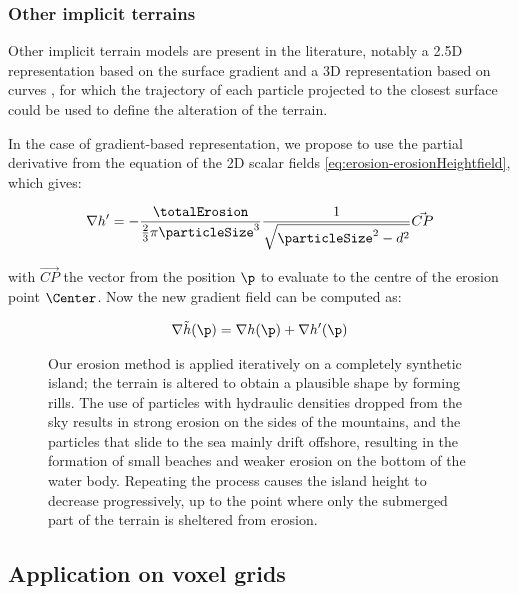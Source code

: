 \subsubsection{Other implicit terrains}
\label{sec:erosion-application_on_other_implicit}
Other implicit terrain models are present in the literature, notably a 2.5D representation based on the surface gradient \cite{Guerin2022} and a 3D representation based on curves \cite{Becher2017}, for which the trajectory of each particle projected to the closest surface could be used to define the alteration of the terrain.

In the case of gradient-based representation, we propose to use the partial derivative from the equation of the 2D scalar fields \cref{eq:erosion-erosionHeightfield}, which gives:

\begin{align}
    \label{eq:erosion-erosion-gradients}
    \nabla h' = - \frac{\totalErosion}{\frac{2}{3}\pi \particleSize^3} \frac{1}{\sqrt{\particleSize^2 - d^2} } \vec{CP}
\end{align}

with $\vec{CP}$ the vector from the position $\p$ to evaluate to the centre of the erosion point $\Center$.
Now the new gradient field can be computed as: 

\begin{align*}
    \nabla \Tilde{h}(\p) = \nabla h(\p) + \nabla h'(\p)
\end{align*}

\begin{figure}
    \caption{Our erosion method is applied iteratively on a completely synthetic island; the terrain is altered to obtain a plausible shape by forming rills. The use of particles with hydraulic densities dropped from the sky results in strong erosion on the sides of the mountains, and the particles that slide to the sea mainly drift offshore, resulting in the formation of small beaches and weaker erosion on the bottom of the water body. Repeating the process causes the island height to decrease progressively, up to the point where only the submerged part of the terrain is sheltered from erosion.}
    \label{fig:erosion-continuous-erosion}
\end{figure}

\subsection{Application on voxel grids}
\label{sec:erosion-application_on_voxels}

